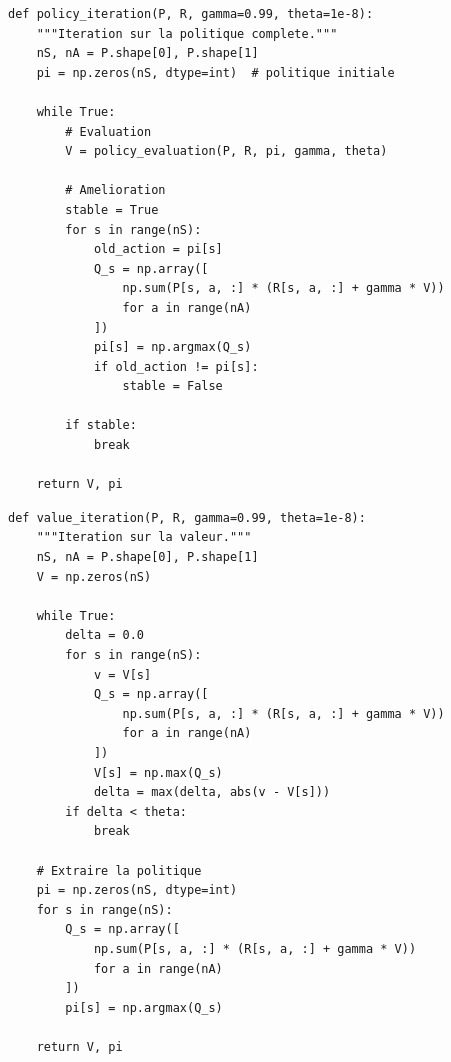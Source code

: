 \begin{codeblock}[title=\textbf{It\'eration sur la politique}]
\begin{verbatim}
def policy_iteration(P, R, gamma=0.99, theta=1e-8):
    """Iteration sur la politique complete."""
    nS, nA = P.shape[0], P.shape[1]
    pi = np.zeros(nS, dtype=int)  # politique initiale

    while True:
        # Evaluation
        V = policy_evaluation(P, R, pi, gamma, theta)

        # Amelioration
        stable = True
        for s in range(nS):
            old_action = pi[s]
            Q_s = np.array([
                np.sum(P[s, a, :] * (R[s, a, :] + gamma * V))
                for a in range(nA)
            ])
            pi[s] = np.argmax(Q_s)
            if old_action != pi[s]:
                stable = False

        if stable:
            break

    return V, pi
\end{verbatim}
\end{codeblock}

\begin{codeblock}[title=\textbf{It\'eration sur la valeur}]
\begin{verbatim}
def value_iteration(P, R, gamma=0.99, theta=1e-8):
    """Iteration sur la valeur."""
    nS, nA = P.shape[0], P.shape[1]
    V = np.zeros(nS)

    while True:
        delta = 0.0
        for s in range(nS):
            v = V[s]
            Q_s = np.array([
                np.sum(P[s, a, :] * (R[s, a, :] + gamma * V))
                for a in range(nA)
            ])
            V[s] = np.max(Q_s)
            delta = max(delta, abs(v - V[s]))
        if delta < theta:
            break

    # Extraire la politique
    pi = np.zeros(nS, dtype=int)
    for s in range(nS):
        Q_s = np.array([
            np.sum(P[s, a, :] * (R[s, a, :] + gamma * V))
            for a in range(nA)
        ])
        pi[s] = np.argmax(Q_s)

    return V, pi
\end{verbatim}
\end{codeblock}

